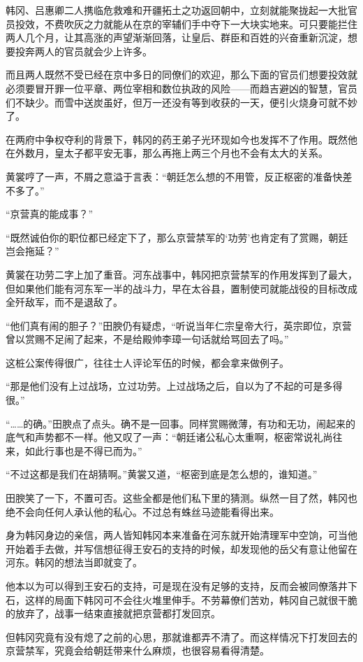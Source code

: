 韩冈、吕惠卿二人携临危救难和开疆拓土之功返回朝中，立刻就能聚拢起一大批官员投效，不费吹灰之力就能从在京的宰辅们手中夺下一大块实地来。可只要能拦住两人几个月，让其高涨的声望渐渐回落，让皇后、群臣和百姓的兴奋重新沉淀，想要投奔两人的官员就会少上许多。

而且两人既然不受已经在京中多日的同僚们的欢迎，那么下面的官员们想要投效就必须要冒开罪一位平章、两位宰相和数位执政的风险——而趋吉避凶的智慧，官员们不缺少。而雪中送炭虽好，但万一还没有等到收获的一天，便引火烧身可就不妙了。

在两府中争权夺利的背景下，韩冈的药王弟子光环现如今也发挥不了作用。既然他在外数月，皇太子都平安无事，那么再拖上两三个月也不会有太大的关系。

黄裳哼了一声，不屑之意溢于言表：“朝廷怎么想的不用管，反正枢密的准备快差不多了。”

“京营真的能成事？”

“既然诚伯你的职位都已经定下了，那么京营禁军的‘功劳’也肯定有了赏赐，朝廷岂会拖延？”

黄裳在功劳二字上加了重音。河东战事中，韩冈把京营禁军的作用发挥到了最大，但如果他们能有河东军一半的战斗力，早在太谷县，置制使司就能战役的目标改成全歼敌军，而不是退敌了。

“他们真有闹的胆子？”田腴仍有疑虑，“听说当年仁宗皇帝大行，英宗即位，京营曾以赏赐不足闹了起来，不是给殿帅李璋一句话就给骂回去了吗。”

这桩公案传得很广，往往士人评论军伍的时候，都会拿来做例子。

“那是他们没有上过战场，立过功劳。上过战场之后，自以为了不起的可是多得很。”

“……的确。”田腴点了点头。确不是一回事。同样赏赐微薄，有功和无功，闹起来的底气和声势都不一样。他又叹了一声：“朝廷诸公私心太重啊，枢密常说礼尚往来，如此行事也是不得已而为。”

“不过这都是我们在胡猜啊。”黄裳又道，“枢密到底是怎么想的，谁知道。”

田腴笑了一下，不置可否。这些全都是他们私下里的猜测。纵然一目了然，韩冈也绝不会向任何人承认他的私心。不过总有蛛丝马迹能看得出来。

身为韩冈身边的亲信，两人皆知韩冈本来准备在河东就开始清理军中空饷，可当他开始着手去做，并写信想征得王安石的支持的时候，却发现他的岳父有意让他留在河东。韩冈的想法当即就变了。

他本以为可以得到王安石的支持，可是现在没有足够的支持，反而会被同僚落井下石，这样的局面下韩冈可不会往火堆里伸手。不劳幕僚们苦劝，韩冈自己就很干脆的放弃了，战事一结束直接就把京营都打发回京。

但韩冈究竟有没有熄了之前的心思，那就谁都弄不清了。而这样情况下打发回去的京营禁军，究竟会给朝廷带来什么麻烦，也很容易看得清楚。

